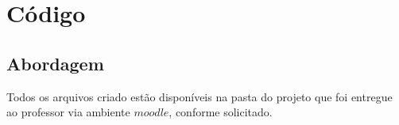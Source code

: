\chapter{Código}
\section{Abordagem}
	Todos os arquivos criado estão disponíveis na pasta do projeto que foi entregue ao professor via ambiente $moodle$, conforme solicitado.
	

